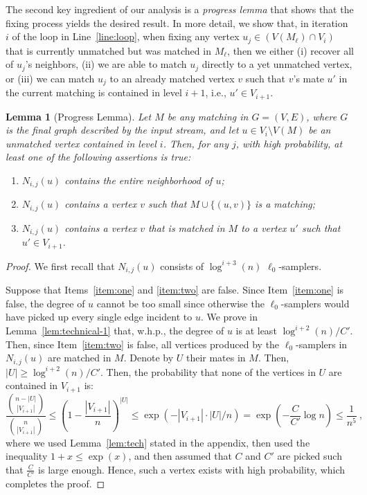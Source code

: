 \documentclass[11pt,a4paper]{article}
\newtheorem{lemma}{Lemma}
\begin{document}
The second key ingredient of our analysis is a {\em progress lemma} that shows that the fixing process yields the desired result. In more detail, we show that, in iteration $i$ of the loop in Line~\ref{line:loop}, when fixing any vertex $u_j \in (V(M_\ell) \cap V_i)$ that is currently unmatched but was matched in $M_{\ell}$, then we either (i) recover all of $u_j$'s neighbors, (ii) we are able to match $u_j$ directly to a yet unmatched vertex, or (iii) we can match $u_j$ to an already matched vertex $v$ such that $v$'s mate $u'$ in the current matching is contained in level $i+1$, i.e., $u' \in V_{i+1}$. 


\begin{lemma}[Progress Lemma]\label{lem:next-level} \label{lem:progress}
 Let $M$ be any matching in $G=(V, E)$, where $G$ is the final graph described by the input stream, and let $u \in V_i \setminus V(M)$ be an unmatched vertex contained in level $i$. Then, for any $j$, with high probability, at least one of the following assertions is true:
 \begin{enumerate}
     \item $N_{i,j}(u)$ contains the entire neighborhood of $u$; \label{item:one}
     \item $N_{i,j}(u)$ contains a vertex $v$ such that $M \cup \{(u,v) \}$ is a matching; \label{item:two}
     \item $N_{i,j}(u)$ contains a vertex $v$ that is matched in $M$ to a vertex $u'$ such that $u' \in V_{i+1}$. \label{item:three}
 \end{enumerate}
\end{lemma}
\begin{proof}We first recall that $N_{i,j}(u)$ consists of $\log^{i+3}(n)$ $\ell_0$-samplers. 

    Suppose that Items~\ref{item:one} and \ref{item:two} are false. Since Item~\ref{item:one} is false, the degree of $u$ cannot be too small since otherwise the $\ell_0$-samplers would have picked up every single edge incident to $u$. We prove in  Lemma~\ref{lem:technical-1} that, w.h.p., the degree of $u$ is at least $\log^{i+2}(n)/C'$. Then, since Item~\ref{item:two} is false, all vertices produced by the $\ell_0$-samplers in $N_{i,j}(u)$ are matched in $M$. Denote by $U$ their mates in $M$. Then, $|U| \ge \log^{i+2}(n)/C'$. Then, the probability that none of the vertices in $U$ are contained in $V_{i+1}$ is:
    $$\frac{{n - |U| \choose |V_{i+1}|}}{    
    {{n \choose |V_{i+1}|}}}  \le \left(1 - \frac{|V_{i+1}|}{n} \right)^{|U|} \le \exp(-|V_{i+1}| \cdot |U| / n) = \exp(-\frac{C}{C'} \log n) \le \frac{1}{n^5} \ ,$$
where we used Lemma~\ref{lem:tech} stated in the appendix, then used the inequality $1+x \le \exp(x)$, and then assumed that $C$ and $C'$ are picked such that $\frac{C}{C'}$ is large enough. Hence, such a vertex exists with high probability, which completes the proof.

\end{proof}
\end{document}
